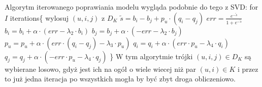 \documentclass{pracamgr}
\begin{document}
    Algorytm iterowanego poprawiania modelu wygląda podobnie do tego z SVD:\newline\newline
    \hspace*{16pt}	for $I$ iterations\{\newline
    \hspace*{32pt}		wylosuj $(u,i,j)$ z $D_K$\newline 
    \hspace*{32pt}		$\tilde{s}=b_i-b_j+p_u\cdot(q_i-q_j)$\newline
    \hspace*{32pt}		$err=\frac{e^{-\tilde{s}}}{1+e^{-\tilde{s}}}$\newline
    \hspace*{32pt}		$b_i=b_i+\alpha\cdot(err-\lambda_2\cdot b_i)$\newline
    \hspace*{32pt}		$b_j=b_j+\alpha\cdot(-err-\lambda_2\cdot b_j)$\newline
    \hspace*{32pt}		$p_u=p_u+\alpha\cdot(err\cdot (q_i-q_j)-\lambda_3\cdot p_u)$\newline
    \hspace*{32pt}		$q_i=q_i+\alpha\cdot(err\cdot p_u-\lambda_4\cdot q_i)$\newline
    \hspace*{32pt}		$q_j=q_j+\alpha\cdot(-err\cdot p_u-\lambda_4\cdot q_j)$\newline
    \hspace*{16pt}	\}\newline
    W tym algorytmie trójki $(u,i,j)\in D_K$ są wybierane losowo, gdyż jest ich na ogół o wiele wiecej niż par $(u,i)\in K$
    i przez to już jedna iteracja po wszystkich mogła by być zbyt droga obliczeniowo.
   
\end{document}
